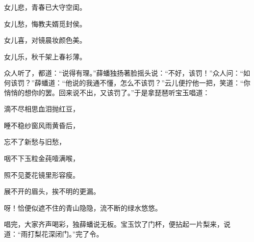 \begin{poem}
    \begin{pl} 女儿悲，青春已大守空闺。\end{pl}

    \begin{pl} 女儿愁，悔教夫婿觅封侯。\end{pl}

    \begin{pl} 女儿喜，对镜晨妆颜色美。\end{pl}

    \begin{pl} 女儿乐，秋千架上春衫薄。\end{pl}
\end{poem}


\begin{parag}
    众人听了，都道：“说得有理。”薛蟠独扬著脸摇头说：“不好，该罚！”众人问：“如何该罚？”薛蟠道：“他说的我通不懂，怎么不该罚？”云儿便拧他一把，笑道：“你悄悄的想你的罢。回来说不出，又该罚了。”于是拿琵琶听宝玉唱道：
\end{parag}


\begin{poem}
    \begin{pl}滴不尽相思血泪抛红豆，\end{pl}

    \begin{pl}睡不稳纱窗风雨黄昏后，\end{pl}

    \begin{pl}忘不了新愁与旧愁，\end{pl}

    \begin{pl}咽不下玉粒金莼噎满喉，\end{pl}

    \begin{pl}照不见菱花镜里形容瘦。\end{pl}

    \begin{pl}展不开的眉头，挨不明的更漏。\end{pl}

    \begin{pl}呀！恰便似遮不住的青山隐隐，流不断的绿水悠悠。\end{pl}
\end{poem}


\begin{parag}
    唱完，大家齐声喝彩，独薛蟠说无板。宝玉饮了门杯，便拈起一片梨来，说道：“雨打梨花深闭门。”完了令。
\end{parag}



